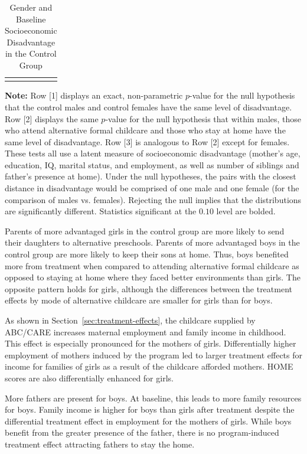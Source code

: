\begin{table}[!htpb]
\begin{threeparttable}
\caption{Gender and Baseline Socioeconomic Disadvantage in the Control Group} \label{table:disadtests}
\centering
\begin{tabularx}{16.5cm}{XcX}
&  &
\end{tabularx}
\begin{tablenotes}
\footnotesize
\item \textbf{Note:} Row [1] displays an exact, non-parametric $p$-value for the null hypothesis that the control males and control females have the same level of disadvantage. Row [2] displays the same $p$-value for the null  hypothesis that within males, those who attend alternative formal childcare and those who stay at home have the same level of disadvantage. Row [3] is analogous to Row [2] except for females. These tests all use a latent measure of socioeconomic disadvantage (mother's age, education, IQ, marital status, and employment, as well as number of siblings and father's presence at home). Under the null hypotheses, the pairs with the closest distance in disadvantage would be comprised of one male and one female (for the comparison of males vs. females). Rejecting the null implies that the distributions are significantly different. Statistics significant at the $0.10$ level are bolded.
\end{tablenotes}
\end{threeparttable}
\end{table}

Parents of more advantaged girls in the control group are more likely to send their daughters to alternative preschools. Parents of more advantaged boys in the control group are more likely to keep their sons at home. Thus, boys benefited more from treatment when compared to attending alternative formal childcare as opposed to staying at home where they faced better environments than girls. The opposite pattern holds for girls, although the differences between the treatment effects by mode of alternative childcare are smaller for girls than for boys. 

As shown in Section~\ref{sec:treatment-effects}, the childcare supplied by ABC/CARE increases maternal employment and family income in childhood. This effect is especially pronounced for the mothers of girls. Differentially higher employment of mothers induced by the program led to larger treatment effects for income for families of girls as a result of the childcare afforded mothers. HOME scores are also differentially enhanced for girls.

More fathers are present for boys. At baseline, this leads to more family resources for boys. Family income is higher for boys than girls after treatment despite the differential treatment effect in employment for the mothers of girls. While boys benefit from the greater presence of the father, there is no program-induced treatment effect attracting fathers to stay the home.


